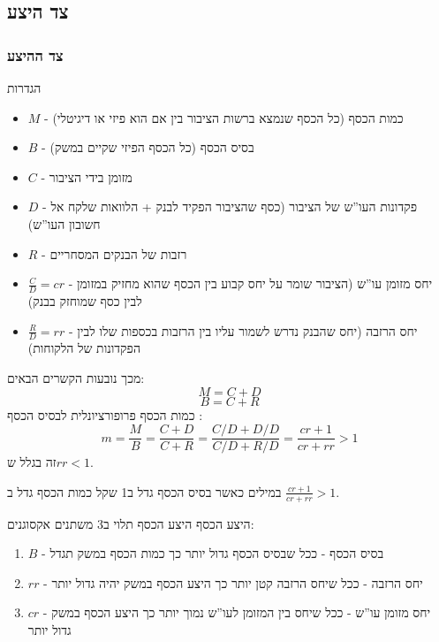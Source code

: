 \documentclass[usenames,dvipsnames,10pt]{beamer}
\begin{document}
\begin{RTL}
\section{צד היצע}
\begin{frame}[allowframebreaks]
    \frametitle{צד ההיצע}
    \begin{block}{הגדרות}
        \begin{itemize}
            \item $M$ - כמות הכסף (כל הכסף שנמצא ברשות הציבור בין אם הוא פיזי או דיגיטלי)
            \item $B$ - בסיס הכסף (כל הכסף הפיזי שקיים במשק)
            \item $C$ - מזומן בידי הציבור
            \item $D$ - פקדונות העו''ש של הציבור (כסף שהציבור הפקיד לבנק + הלוואות שלקח אל חשובון העו''ש)
            \item $R$ - רזבות של הבנקים המסחריים
            \item $\frac{C}{D} = cr$ - יחס מזומן עו''ש (הציבור שומר על יחס קבוע בין הכסף שהוא מחזיק במזומן לבין כסף שמוחזק בבנק)
            \item $ \frac{R}{D} = rr$ - יחס הרזבה (יחס שהבנק נדרש לשמור עליו בין הרזבות בכספות שלו לבין הפקדונות של הלקוחות)
        \end{itemize}
    \end{block}
    \framebreak
    מכך נובעות הקשרים הבאים:
    $$M = C + D$$
    $$B = C + R$$
    כמות הכסף פרופורציונלית לבסיס הכסף :
    $$m = \frac{M}{B} = \frac{C + D}{C + R} = \frac{C/D + D/D}{C/D + R/D} = \frac{cr + 1}{cr + rr} > 1$$
    זה בגלל ש$rr < 1$.
    \begin{block}{במילים}
        כאשר בסיס הכסף גדל ב1 שקל כמות הכסף גדל ב $\frac{cr + 1}{cr + rr} > 1$.
    \end{block}

    \begin{block}{היצע הכסף}
        היצע הכסף תלוי ב3 משתנים אקסוגנים:
        \begin{enumerate}
            \item $B$ - בסיס הכסף - ככל שבסיס הכסף גדול יותר כך כמות הכסף במשק תגדל
            \item $rr$ - יחס הרזבה - ככל שיחס הרזבה קטן יותר כך היצע הכסף במשק יהיה גדול יותר
            \item $cr$ - יחס מזומן עו''ש - ככל שיחס בין המזומן לעו''ש נמוך יותר כך היצע הכסף במשק גדול יותר
        \end{enumerate}
    \end{block}
    


\end{frame}
\end{RTL}
\end{document}
